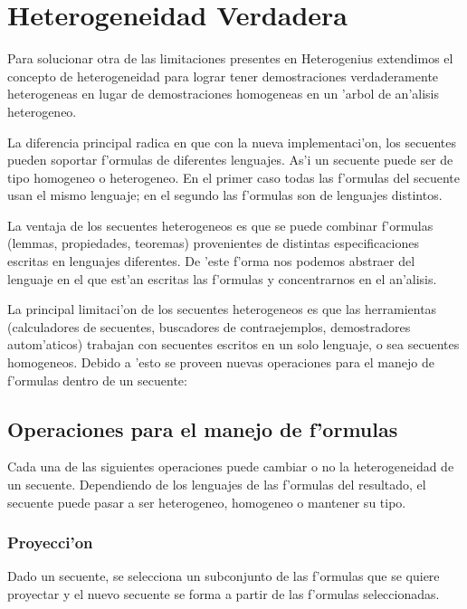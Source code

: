 \section{Heterogeneidad Verdadera}
\label{sec:heterogeneidad-verdadera}

Para solucionar otra de las limitaciones presentes en Heterogenius extendimos el concepto de heterogeneidad para lograr tener demostraciones verdaderamente heterogeneas en lugar de demostraciones homogeneas en un 'arbol de an'alisis heterogeneo. 

La diferencia principal radica en que con la nueva implementaci'on, los secuentes pueden soportar f'ormulas de diferentes lenguajes. As'i un secuente puede ser de tipo homogeneo o heterogeneo. En el primer caso todas las f'ormulas del secuente usan el mismo lenguaje; en el segundo las f'ormulas son de lenguajes distintos.

La ventaja de los secuentes heterogeneos es que se puede combinar f'ormulas (lemmas, propiedades, teoremas) provenientes de distintas especificaciones escritas en lenguajes diferentes. De 'este f'orma nos podemos abstraer del lenguaje en el que est'an escritas las f'ormulas y concentrarnos en el an'alisis.

La principal limitaci'on de los secuentes heterogeneos es que las herramientas (calculadores de secuentes, buscadores de contraejemplos, demostradores autom'aticos) trabajan con secuentes escritos en un solo lenguaje, o sea secuentes homogeneos. Debido a 'esto se proveen nuevas operaciones para el manejo de f'ormulas dentro de un secuente:

\subsection{Operaciones para el manejo de f'ormulas}

Cada una de las siguientes operaciones puede cambiar o no la heterogeneidad de un secuente.  Dependiendo de los lenguajes de las f'ormulas del resultado, el secuente puede pasar a ser heterogeneo, homogeneo o mantener su tipo.

\subsubsection{Proyecci'on}

Dado un secuente, se selecciona un subconjunto de las f'ormulas que se quiere proyectar y el nuevo secuente se forma a partir de las f'ormulas seleccionadas.

